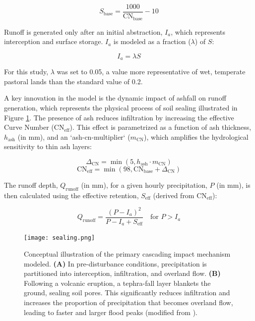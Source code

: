 \documentclass[12pt, a4paper]{article}
\begin{document}
\begin{equation}
S_{\text{base}} = \frac{1000}{\text{CN}_{\text{base}}} - 10
\end{equation}

Runoff is generated only after an initial abstraction, $I_a$, which represents interception and surface storage. $I_a$ is modeled as a fraction ($\lambda$) of $S$:

\begin{equation}
I_a = \lambda S
\end{equation}

For this study, $\lambda$ was set to 0.05, a value more representative of wet, temperate pastoral lands than the standard value of 0.2.

A key innovation in the model is the dynamic impact of ashfall on runoff generation, which represents the physical process of soil sealing illustrated in Figure \ref{fig:sealing}. The presence of ash reduces infiltration by increasing the effective Curve Number ($\text{CN}_{\text{eff}}$). This effect is parametrized as a function of ash thickness, $h_{\text{ash}}$ (in mm), and an `ash-cn-multiplier` ($m_{\text{CN}}$), which amplifies the hydrological sensitivity to thin ash layers:

\begin{equation}
\Delta_{\text{CN}} = \min(5, h_{\text{ash}} \cdot m_{\text{CN}})
\end{equation}
\begin{equation}
\text{CN}_{\text{eff}} = \min(98, \text{CN}_{\text{base}} + \Delta_{\text{CN}})
\end{equation}

The runoff depth, $Q_{\text{runoff}}$ (in mm), for a given hourly precipitation, $P$ (in mm), is then calculated using the effective retention, $S_{\text{eff}}$ (derived from $\text{CN}_{\text{eff}}$):

\begin{equation}
Q_{\text{runoff}} = \frac{(P - I_a)^2}{P - I_a + S_{\text{eff}}} \quad \text{for } P > I_a
\end{equation}


\begin{figure}[H]
    \centering
    \texttt{[image: sealing.png]}
    \caption{Conceptual illustration of the primary cascading impact mechanism modeled. \textbf{(A)} In pre-disturbance conditions, precipitation is partitioned into interception, infiltration, and overland flow. \textbf{(B)} Following a volcanic eruption, a tephra-fall layer blankets the ground, sealing soil pores. This significantly reduces infiltration and increases the proportion of precipitation that becomes overland flow, leading to faster and larger flood peaks (modified from \citealp{Pierson2014}).}
    \label{fig:sealing}
\end{figure}
\end{document}
